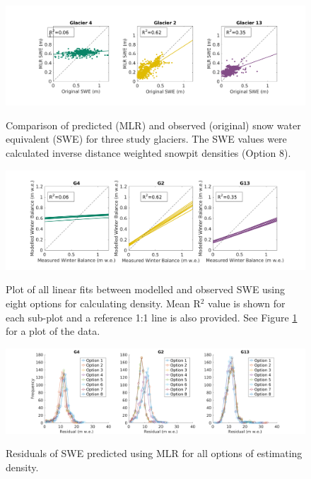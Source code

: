 \documentclass[12pt]{article}
\begin{document}
\begin{landscape}
\begin{figure}
	\centering
	\includegraphics[height = 0.5\textwidth]{MLRfit_opt8.png}\\
	\caption{Comparison of predicted (MLR) and observed (original) snow water equivalent (SWE) for three study glaciers. The SWE values were calculated inverse distance weighted snowpit densities (Option 8).}
	\label{fig:MLRfit_opt8}
\end{figure}

\pagebreak

\begin{figure}
	\centering
	\includegraphics[height = 0.4\textwidth]{MLRfit_allLines.png}\\
	\caption{Plot of all linear fits between modelled and observed SWE using eight options for calculating density. Mean R$^2$ value is shown for each sub-plot and a reference 1:1 line is also provided. See Figure \ref{fig:MLRfit_opt8} for a plot of the data. }
	\label{fig:MLRfit_allLines}
\end{figure}

\begin{figure}
	\centering
	\includegraphics[height = 0.4\textwidth]{MLRresiduals_all.png}\\
	\caption{Residuals of SWE predicted using MLR for all options of estimating density.}
	\label{fig:MLRresiduals_all}
\end{figure}

\end{landscape}
 
\end{document}
